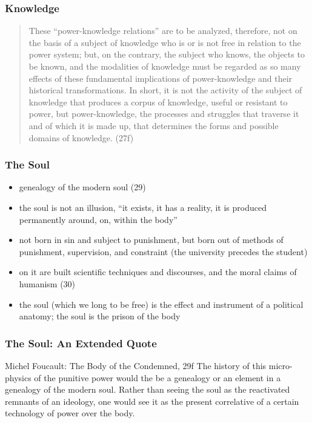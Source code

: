 \documentclass[xcolor=dvipsnames]{beamer}
\begin{document}
\begin{frame}
  \frametitle{Knowledge}
  \begin{quote}
    These ``power-knowledge relations'' are to be analyzed, therefore,
    not on the basis of a subject of knowledge who is or is not free
    in relation to the power system; but, on the contrary, the subject
    who knows, the objects to be known, and the modalities of
    knowledge must be regarded as so many effects of these fundamental
    implications of power-knowledge and their historical
    transformations. In short, it is not the activity of the subject
    of knowledge that produces a corpus of knowledge, useful or
    resistant to power, but power-knowledge, the processes and
    struggles that traverse it and of which it is made up, that
    determines the forms and possible domains of knowledge. (27f)
  \end{quote}
\end{frame}

\begin{frame}
  \frametitle{The Soul}
  \begin{itemize}
  \item genealogy of the modern soul (29)
  \item the soul is not an illusion, ``it exists, it has a reality, it
    is produced permanently around, on, within the body''
  \item not born in sin and subject to punishment, but born out of
    methods of punishment, supervision, and constraint (the university
    precedes the student)
  \item on it are built scientific techniques and discourses, and the
    moral claims of humanism (30)
  \item the soul (which we long to be free) is the effect and
    instrument of a political anatomy; the soul is the prison of the
    body
  \end{itemize}
\end{frame}

\begin{frame}
  \frametitle{The Soul: An Extended Quote}
  \begin{block}{Michel Foucault: The Body of the Condemned, 29f}
    The history of this micro-physics of the punitive power would the
    be a genealogy or an element in a genealogy of the modern soul.
    Rather than seeing the soul as the reactivated remnants of an
    ideology, one would see it as the present correlative of a certain
    technology of power over the body. 
  \end{block}
\end{frame}
\end{document}
